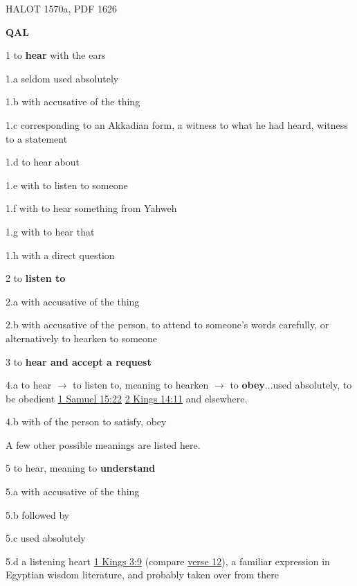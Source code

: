 				\begin{compactdesc}
					\item[HALOT 1570a, PDF 1626] \textbf{} %
						\begin{compactitem}
							\item[\textbf{QAL}]
							\item[1] to \textbf{hear} with the ears
							\item[1.a] seldom used absolutely
							\item[1.b] with accusative of the thing
							\item[1.c] corresponding to an Akkadian form, a witness to what he had heard, witness to a statement
							\item[1.d] to hear about
							\item[1.e] with  to listen to someone
							\item[1.f] with  to hear something from Yahweh
							\item[1.g] with  to hear that
							\item[1.h] with  a direct question
							\item[2] to \textbf{listen to}
							\item[2.a] with accusative of the thing
							\item[2.b] with accusative of the person, to attend to someone's words carefully, or alternatively to hearken to someone
							\item[3] to \textbf{hear and accept a request}
							\item[4.a] to hear $\rightarrow$ to listen to, meaning to hearken $\rightarrow$ to \textbf{obey}...used absolutely, to be obedient \hyperref[1SAMUEL-15-22]{1 Samuel 15:22} \hyperref[2KINGS-14-11]{2 Kings 14:11} and elsewhere.
							\item[4.b] with  of the person to satisfy, obey
								\begin{compactitem}
									\item A few other possible meanings are listed here.
								\end{compactitem}
							\item[5] to hear, meaning to \textbf{understand}
							\item[5.a] with accusative of the thing
							\item[5.b] followed by 
							\item[5.c] used absolutely
							\item[5.d]  a listening heart \hyperref[1KINGS-3-9]{1 Kings 3:9} (compare \hyperref[1KINGS-3-12]{verse 12}), a familiar expression in Egyptian wisdom literature, and probably taken over from there

\end{compactitem}
\end{compactdesc}
